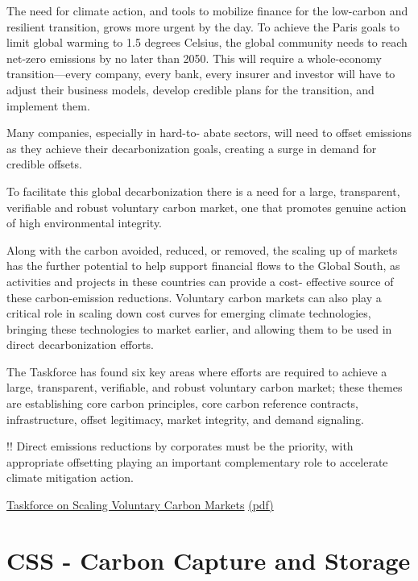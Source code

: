 \documentclass[
]{book}
\begin{document}
The need for climate action, and tools to
mobilize finance for the low-carbon and
resilient transition, grows more urgent by the
day. To achieve the Paris goals to limit global
warming to 1.5 degrees Celsius, the global
community needs to reach net-zero emissions
by no later than 2050. This will require a
whole-economy transition---every company,
every bank, every insurer and investor
will have to adjust their business models,
develop credible plans for the transition, and
implement them.

Many companies, especially in hard-to-
abate sectors, will need to offset emissions
as they achieve their decarbonization goals,
creating a surge in demand for credible
offsets.

To facilitate this global
decarbonization there is a need for a large,
transparent, verifiable and robust voluntary
carbon market, one that promotes genuine
action of high environmental integrity.

Along with the carbon avoided, reduced, or
removed, the scaling up of markets has the
further potential to help support financial
flows to the Global South, as activities and
projects in these countries can provide a cost-
effective source of these carbon-emission
reductions. Voluntary carbon markets can
also play a critical role in scaling down cost
curves for emerging climate technologies,
bringing these technologies to market earlier,
and allowing them to be used in direct
decarbonization efforts.

The Taskforce has found
six key areas where efforts are required
to achieve a large, transparent, verifiable,
and robust voluntary carbon market;
these themes are establishing core carbon
principles, core carbon reference contracts,
infrastructure, offset legitimacy, market
integrity, and demand signaling.

!! Direct
emissions reductions by corporates must
be the priority, with appropriate offsetting
playing an important complementary role
to accelerate climate mitigation action.

\href{https://www.iif.com/tsvcm}{Taskforce on Scaling Voluntary Carbon Markets}
\href{pdf/TSVCM_2021_Scaling_Carbon_Markets.pdf}{(pdf)}

\hypertarget{css---carbon-capture-and-storage}{%
\chapter{CSS - Carbon Capture and Storage}\label{css---carbon-capture-and-storage}}
\end{document}

